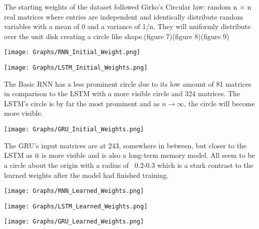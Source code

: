 \documentclass{article}
\begin{document}
The starting weights of the dataset followed Girko's Circular law:
random n $\times$ n real matrices
where entries are independent and identically distribute random variables with a mean of 0 and a variance of 1/n. They will uniformly distribute over the unit disk creating a circle like shape.(figure 7)(figure 8)(figure 9)
\begin{center}
    \begin{minipage}{0.48\linewidth}
        \texttt{[image: Graphs/RNN\_Initial\_Weight.png]}
    \end{minipage}
    \begin{minipage}{0.48\linewidth}
     \texttt{[image: Graphs/LSTM\_Initial\_Weights.png]}    
    \end{minipage}
\end{center}
The Basic RNN has a less prominent circle due to its low amount of 81 matrices in comparison to the LSTM with a more visible circle and 324 matrices. The LSTM's circle is by far the most prominent and as ${n\to\infty}$, the circle will become more visible.
\begin{center}
    \begin{minipage}{0.48\linewidth}
     \texttt{[image: Graphs/GRU\_Initial\_Weights.png]}    
    \end{minipage}
\end{center}
The GRU's input matrices are at 243, somewhere in between, but closer to the LSTM as it is more visible and is also a long-term memory model. All seem to be a circle about the origin with a radius of ~0.2-0.3 which is a stark contrast to the learned weights after the model had finished training.
\begin{center}
    \begin{minipage}{0.48\linewidth}
        \texttt{[image: Graphs/RNN\_Learned\_Weights.png]}
    \end{minipage}
    \begin{minipage}{0.48\linewidth}
     \texttt{[image: Graphs/LSTM\_Learned\_Weights.png]}    
    \end{minipage}
    \begin{minipage}{0.48\linewidth}
    \texttt{[image: Graphs/GRU\_Learned\_Weights.png]}
    \end{minipage}
\end{center}
\end{document}
